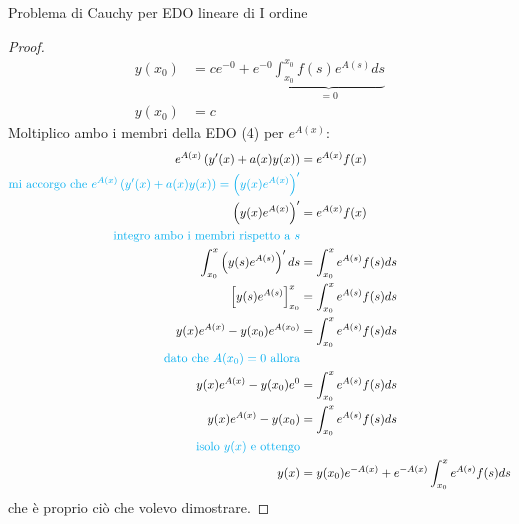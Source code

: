 \documentclass{article}  %
\begin{document}
\begin{theorem}{Problema di Cauchy per EDO lineare di I ordine}
\begin{proof}
\begin{align*}
			y(x_0) & = {c}e^{-0} + e^{-0} \underbrace{\int_{x_0}^{x_0} f(s)e^{A(s)} ds}_{=0} \\
			y(x_0) & = c
		\end{align*}
		Moltiplico ambo i membri della EDO (4) per $e^{A(x)}$:
		\begin{align*}
			e^{A(x)} \left(y'(x)+a(x)y(x) \right)                                                                         & = e^{A(x)}f(x)                                              \\
			\text{\textcolor{cyan}{mi accorgo che $e^{A(x)} \left(y'(x)+a(x)y(x) \right) = \left(y(x)e^{A(x)} \right)'$}} &                                                             \\
			\left(y(x)e^{A(x)} \right)'                                                                                   & = e^{A(x)}f(x)                                              \\
			\text{\textcolor{cyan}{integro ambo i membri rispetto a $s$}}                                                 &                                                             \\
			\int_{x_0}^{x} \left(y(s)e^{A(s)} \right)' ds                                                                 & = \int_{x_0}^{x} e^{A(s)}f(s) ds                            \\
			\left[y(s)e^{A(s)} \right]_{x_0}^{x}                                                                          & = \int_{x_0}^{x} e^{A(s)}f(s) ds                            \\
			y(x)e^{A(x)} - y(x_0)e^{A(x_0)}                                                                               & = \int_{x_0}^{x} e^{A(s)}f(s) ds                            \\
			\text{\textcolor{cyan}{dato che $A(x_0)=0$ allora}}                                                           &                                                             \\
			y(x)e^{A(x)} - y(x_0)e^{0}                                                                                    & = \int_{x_0}^{x} e^{A(s)}f(s) ds                            \\
			y(x)e^{A(x)} - y(x_0)                                                                                         & = \int_{x_0}^{x} e^{A(s)}f(s) ds                            \\
			\text{\textcolor{cyan}{isolo $y(x)$ e ottengo}}                                                               &                                                             \\
			y(x)                                                                                                          & = y(x_0)e^{-A(x)} + e^{-A(x)}\int_{x_0}^{x} e^{A(s)}f(s) ds
		\end{align*}
		che è proprio ciò che volevo dimostrare.
	\end{proof}
\end{theorem}
\end{document}
